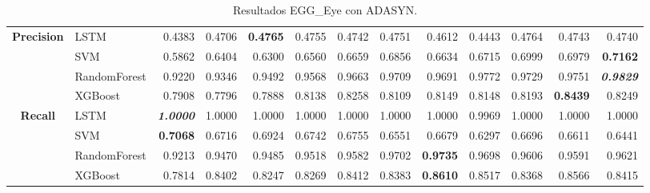 \begin{table}[H]
\begin{adjustbox}{max width=12cm}
\begin{tabular}{|c|l|r|r|r|r|r|r|r|r|r|r|r|}
			\hline
			\textbf{Precision} &  LSTM &  0.4383 &  0.4706 & \textbf{  0.4765 } &  0.4755 &  0.4742 &  0.4751 &  0.4612 &  0.4443 &  0.4764 &  0.4743 &  0.4740 \\
			&  SVM &  0.5862 &  0.6404 &  0.6300 &  0.6560 &  0.6659 &  0.6856 &  0.6634 &  0.6715 &  0.6999 &  0.6979 & \textbf{  0.7162 } \\
			&  RandomForest &  0.9220 &  0.9346 &  0.9492 &  0.9568 &  0.9663 &  0.9709 &  0.9691 &  0.9772 &  0.9729 &  0.9751 & \textit{ \textbf{  0.9829 } } \\
			&  XGBoost &  0.7908 &  0.7796 &  0.7888 &  0.8138 &  0.8258 &  0.8109 &  0.8149 &  0.8148 &  0.8193 & \textbf{  0.8439 } &  0.8249 \\			
			\hline
			\textbf{Recall} &  LSTM & \textit{ \textbf{  1.0000 } } &  1.0000 &  1.0000 &  1.0000 &  1.0000 &  1.0000 &  1.0000 &  0.9969 &  1.0000 &  1.0000 &  1.0000 \\
			&  SVM & \textbf{  0.7068 } &  0.6716 &  0.6924 &  0.6742 &  0.6755 &  0.6551 &  0.6679 &  0.6297 &  0.6696 &  0.6611 &  0.6441 \\
			&  RandomForest &  0.9213 &  0.9470 &  0.9485 &  0.9518 &  0.9582 &  0.9702 & \textbf{  0.9735 } &  0.9698 &  0.9606 &  0.9591 &  0.9621 \\
			&  XGBoost &  0.7814 &  0.8402 &  0.8247 &  0.8269 &  0.8412 &  0.8383 & \textbf{  0.8610 } &  0.8517 &  0.8368 &  0.8566 &  0.8415 \\
			\hline
		\end{tabular}
	\end{adjustbox}
	\caption{Resultados EGG\_Eye con ADASYN.}
	\label{tab:EGGEyeADASYN}
\end{table}
